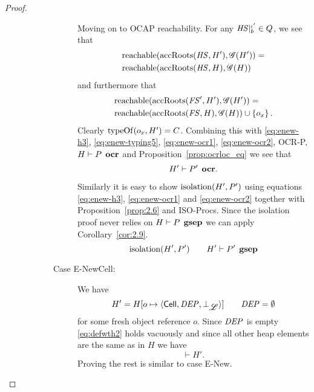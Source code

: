 \begin{proof}
\begin{description}
\begin{description}
\begin{description}
              Moving on to OCAP reachability. For any $\mathit{HS}|_b^{\iota'} \in Q$,
              we see that
              \begin{equation} \label{eq:enew-ocr1}
                \begin{aligned}
                  &\mbox{$\mathrm{reachable}$}(\mbox{$\mathrm{accRoots}$}(\mathit{HS}, H'), \mathscr{G}(H')) = \\
                  &\mbox{$\mathrm{reachable}$}(\mbox{$\mathrm{accRoots}$}(\mathit{HS}, H), \mathscr{G}(H)) 
                \end{aligned}
              \end{equation}
              and furthermore that
              \begin{equation} \label{eq:enew-ocr2}
                \begin{aligned}
                  &\mbox{$\mathrm{reachable}$}(\mbox{$\mathrm{accRoots}$}(\mathit{FS}', H'), \mathscr{G}(H')) = \\
                  &\mbox{$\mathrm{reachable}$}(\mbox{$\mathrm{accRoots}$}(\mathit{FS}, H), \mathscr{G}(H)) \cup \left\{ o_x
                  \right\}.
                \end{aligned}
              \end{equation}
              Clearly $\mbox{$\mathrm{typeOf}$}(o_x, H') = C$. Combining this with
              \eqref{eq:enew-h3}, \eqref{eq:enew-typing5}, \eqref{eq:enew-ocr1},
              \eqref{eq:enew-ocr2}, {\sc OCR-P}, $H \vdash P \:\: \mbox{\bf ocr}$ and
              Proposition~\ref{prop:ocrloc_eq} we see that
              \begin{equation}
                H' \vdash P' \:\: \mbox{\bf ocr}.
              \end{equation}

              Similarly it is easy to show $\mbox{$\mathrm{isolation}$}(H', P')$ using equations
              \eqref{eq:enew-h3}, \eqref{eq:enew-ocr1} and \eqref{eq:enew-ocr2}
              together with Proposition~\ref{prop:2.6} and {\sc ISO-Procs}.
              Since the isolation proof never relies on $H \vdash P \:\: \mbox{\bf gsep}$
              we can apply Corollary~\ref{cor:2.9}.
              \begin{equation}
                \mbox{$\mathrm{isolation}$}(H', P') \quad\quad H' \vdash P' \:\: \mbox{\bf gsep}
              \end{equation}

            \item[Case {\sc E-NewCell}:] We have
              \begin{equation}
                H' = H[o \mapsto \mbox{$\langle \mbox{$\mathsf{Cell}$}{}, \mathit{DEP}, \bot_{\mbox{$\mathscr{L}$}} \rangle$}] \quad\quad \mathit{DEP} = \emptyset
              \end{equation}
              for some fresh object reference $o$. 
              Since $\mathit{DEP}$ is empty \eqref{eq:defwth2} holds vacuously and since
              all other heap elements are the same as in $H$ we have
              \begin{equation}
                \vdash H'.
              \end{equation}
              Proving the rest is similar to case {\sc E-New}.


\end{description}
\end{description}
\end{description}
\end{proof}
